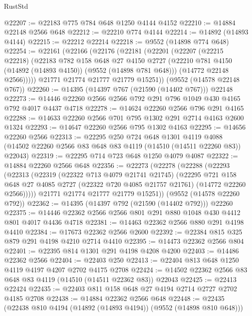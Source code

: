 \begin{lexlean}{RustStd}
\begin{coremodule}
@22207 := @22183 @775 @784 @648 @1250 @4144 @4152
@22210 := @14884 @22148 @2566 @648
@22212 := @22210 @774 @4144
@22214 := @14892 (@14893 @4144)
@22215 := @22212 @22214
@22218 := @9552 (@14898 @774 @648)
@22254 := @22161
    (@22166
      (@22176
        (@22181
          (@22201
            (@22207
              (@22215 @22218)
              (@22183
                @782
                @158
                @648
                @27
                @4150
                @2727
                (@22210 @781 @4150 (@14892 (@14893 @4150)) (@9552 (@14898 @781 @648)))
                (@14772 @22148 @2566)))))
        @21771
        @21774
        @21777
        @21779
        @15251))
    (@9552 (@14578 @22148 @767))
@22260 := @14395 (@14397 @767 (@21590 (@14402 @767))) @22148
@22273 := @14446 @22260 @2566 @2566 @792 @291 @796 @1049 @430 @4165 @792 @4017 @4437 @4718
@22278 := @14624 @22260 @2566 @796 @291 @4165
@22288 := @14633 @22260 @2566 @701 @795 @1302 @291 @2714 @4163 @2600 @1324
@22293 := @14647 @22260 @2566 @795 @1302 @4163
@22295 := @14656 @22260 @2566
@22313 := @22295
    @250
    @724
    @648
    @1301
    @4119
    @4088
    (@14502 @22260 @2566 @83 @648 @83 @4119 (@14510 (@14511 @22260 @83)) @22043)
@22319 := @22295 @714 @723 @648 @1250 @4079 @4087
@22322 := @14884 @22260 @2566 @648
@22356 := @22273
    (@22278
      (@22288
        (@22293
          (@22313
            (@22319
              (@22322 @713 @4079 @21741 @21745)
              (@22295
                @721
                @158
                @648
                @27
                @4085
                @2727
                (@22322 @720 @4085 @21757 @21761)
                (@14772 @22260 @2566)))))
        @21771
        @21774
        @21777
        @21779
        @15251))
    (@9552 (@14578 @22260 @792))
@22362 := @14395 (@14397 @792 (@21590 (@14402 @792))) @22260
@22375 := @14446 @22362 @2566 @2566 @801 @291 @880 @1048 @430 @4412 @801 @4017 @4436 @4718
@22381 := @14463 @22362 @2566 @880 @291 @4198 @4410
@22384 := @17673 @22362 @2566 @2600
@22392 := @22384 @815 @325 @879 @291 @4198 @4210 @2714 @4410
@22395 := @14473 @22362 @2566 @804
@22401 := @22395 @814 @1301 @291 @4198 @4208 @4200
@22403 := @14486 @22362 @2566
@22404 := @22403 @250
@22413 := @22404 @813 @648 @1250 @4119 @4197 @4207 @2702 @4175 @2708
@22424 := @14502 @22362 @2566 @83 @648 @83 @4119 (@14510 (@14511 @22362 @83)) @22043
@22425 := @22413 @22424
@22435 := @22403 @811 @158 @648 @27 @4194 @2714 @2727 @2702 @4185 @2708
@22438 := @14884 @22362 @2566 @648
@22448 := @22435 (@22438 @810 @4194 (@14892 (@14893 @4194)) (@9552 (@14898 @810 @648)))

\end{coremodule}
\end{lexlean}
